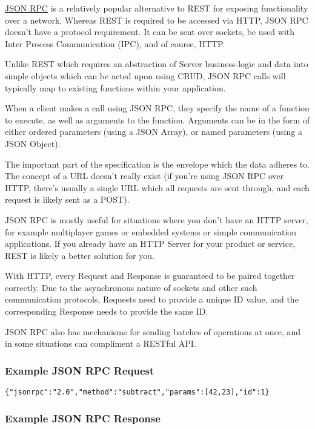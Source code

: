 \href{http://www.jsonrpc.org/specification}{JSON RPC} \cite{JSONRPC} is a relatively popular alternative to REST for exposing functionality over a network. Whereas REST is required to be accessed via HTTP, JSON RPC doesn't have a protocol requirement. It can be sent over sockets, be used with Inter Process Communication (IPC), and of course, HTTP.

Unlike REST which requires an abstraction of Server business-logic and data into simple objects which can be acted upon using CRUD, JSON RPC calls will typically map to existing functions within your application.

When a client makes a call using JSON RPC, they specify the name of a function to execute, as well as arguments to the function. Arguments can be in the form of either ordered parameters (using a JSON Array), or named parameters (using a JSON Object).

The important part of the specification is the envelope which the data adheres to. The concept of a URL doesn't really exist (if you're using JSON RPC over HTTP, there's usually a single URL which all requests are sent through, and each request is likely sent as a POST).

JSON RPC is mostly useful for situations where you don't have an HTTP server, for example multiplayer games or embedded systems or simple communication applications. If you already have an HTTP Server for your product or service, REST is likely a better solution for you.

With HTTP, every Request and Response is guaranteed to be paired together correctly. Due to the asynchronous nature of sockets and other such communication protocols, Requests need to provide a unique ID value, and the corresponding Response needs to provide the same ID.

JSON RPC also has mechanisms for sending batches of operations at once, and in some situations can compliment a RESTful API.

\subsubsection{Example JSON RPC Request}

\begin{verbatim}
{"jsonrpc":"2.0","method":"subtract","params":[42,23],"id":1}
\end{verbatim}

\subsubsection{Example JSON RPC Response}

